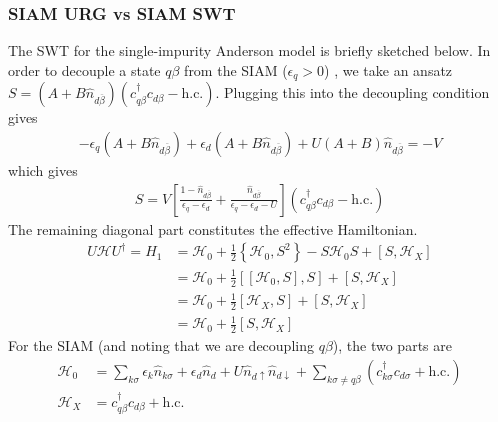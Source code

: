 \documentclass[twoside]{report}
\numberwithin{equation}{section}
\begin{document}
\subsubsection{SIAM URG vs SIAM SWT}
The SWT for the single-impurity Anderson model is briefly sketched below. In order to decouple a state \(q\beta\) from the SIAM (\(\epsilon_q > 0\)) , we take an ansatz \(S = (A + B\hat n_{d\overline\beta})(c^\dagger_{q\beta}c_{d\beta} - \text{h.c.})\). Plugging this into the decoupling condition gives
\begin{equation}\begin{aligned}
	-\epsilon_q\left(A + B\hat n_{d\overline\beta}\right) + \epsilon_d\left(A + B\hat n_{d\overline\beta}\right) + U\left(A + B\right)\hat n_{d\overline\beta} = -V
\end{aligned}\end{equation}
which gives
\begin{equation}\begin{aligned}
	S = V\left[\frac{1 - \hat n_{d\overline\beta}}{\epsilon_q - \epsilon_d} + \frac{\hat n_{d\overline\beta}}{\epsilon_q - \epsilon_d - U}\right] (c^\dagger_{q\beta}c_{d\beta} - \text{h.c.})
\end{aligned}\end{equation}
The remaining diagonal part constitutes the effective Hamiltonian.
\begin{equation}\begin{aligned}
	U\mathcal{H} U^\dagger = H_1 &= \mathcal{H}_0 + \frac{1}{2} \left\{\mathcal{H}_0, S^2\right\} - S \mathcal{H}_0 S + \left[S,\mathcal{H}_X\right]\\
				     &=\mathcal{H}_0 + \frac{1}{2} \left[\left[\mathcal{H}_0, S\right],S\right] + \left[S,\mathcal{H}_X\right]\\
				     &=\mathcal{H}_0 + \frac{1}{2} \left[\mathcal{H}_X,S\right] + \left[S,\mathcal{H}_X\right]\\
				     &=\mathcal{H}_0 + \frac{1}{2} \left[S,\mathcal{H}_X\right]
\end{aligned}\end{equation}
For the SIAM (and noting that we are decoupling \(q\beta\)), the two parts are
\begin{equation}\begin{aligned}
	\mathcal{H}_0 &= \sum_{k\sigma}\epsilon_k \hat n_{k\sigma} + \epsilon_d \hat n_d + U\hat n_{d\uparrow}\hat n_{d\downarrow} + \sum_{k\sigma \neq q\beta}\left(c^\dagger_{k\sigma}c_{d\sigma} + \text{h.c.}\right)\\
\mathcal{H}_X &= c^\dagger_{q\beta}c_{d\beta} + \text{h.c.} 
\end{aligned}\end{equation}
\end{document}
